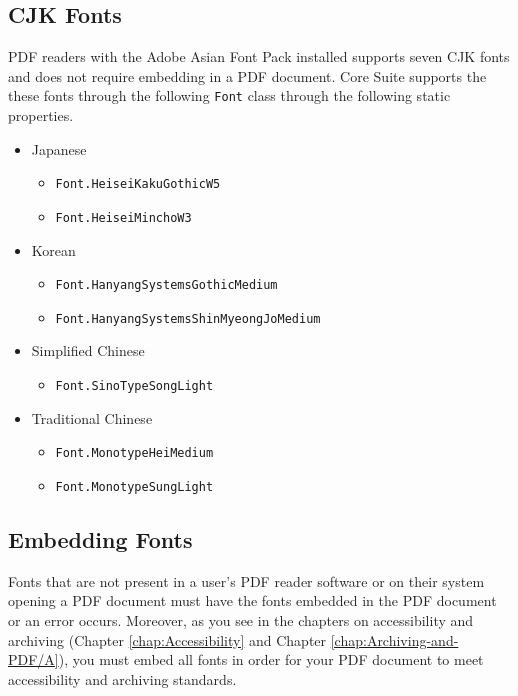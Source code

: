 \documentclass[american,letterpaper]{tufte-book}
\numberwithin{equation}{section}
\numberwithin{figure}{section}
\begin{document}
{\subsection{CJK Fonts}

PDF readers with the Adobe Asian Font Pack installed supports seven
CJK fonts and does not require embedding in a PDF document. Core Suite
supports the these fonts through the following \texttt{Font} class
through the following static properties.
\begin{itemize}
\item Japanese
\begin{itemize}
\item \texttt{Font.HeiseiKakuGothicW5}
\item \texttt{Font.HeiseiMinchoW3}
\end{itemize}
\item Korean
\begin{itemize}
\item \texttt{Font.HanyangSystemsGothicMedium}
\item \texttt{Font.HanyangSystemsShinMyeongJoMedium}
\end{itemize}
\item Simplified Chinese
\begin{itemize}
\item \texttt{Font.SinoTypeSongLight}
\end{itemize}
\item Traditional Chinese
\begin{itemize}
\item \texttt{Font.MonotypeHeiMedium}
\item \texttt{Font.MonotypeSungLight}
\end{itemize}
\end{itemize}

\subsection{Embedding Fonts}

Fonts that are not present in a user's PDF reader software or on their
system opening a PDF document must have the fonts embedded in the
PDF document or an error occurs. Moreover, as you see in the chapters
on accessibility and archiving (Chapter \ref{chap:Accessibility}
and Chapter \ref{chap:Archiving-and-PDF/A}), you must embed all fonts
in order for your PDF document to meet accessibility and archiving
standards.

}
\end{document}
